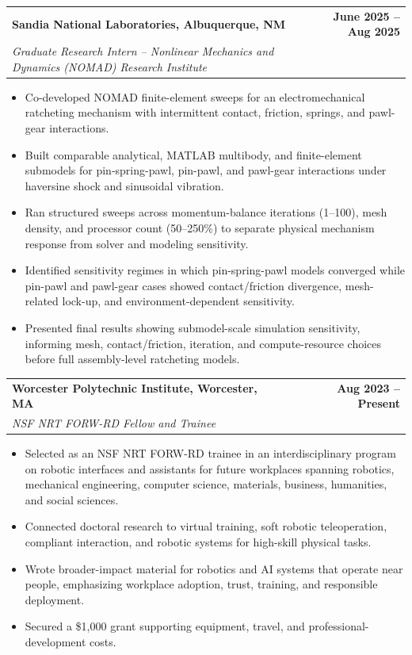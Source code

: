 \documentclass[10pt,letterpaper]{article}
\makeatletter
\newcommand{\roleentry}[4]{%
  \begin{tabularx}{\textwidth}{@{}>{\raggedright\arraybackslash}X r@{}}
    \textbf{#1} & \textbf{#2}\\
    \textit{\textcolor{muted}{#3}} & \textit{\textcolor{muted}{#4}}
  \end{tabularx}
  \vspace{-2pt}
}
\makeatother
\begin{document}
\roleentry{Sandia National Laboratories, Albuquerque, NM}{June 2025 -- Aug 2025}{Graduate Research Intern -- Nonlinear Mechanics and Dynamics (NOMAD) Research Institute}{}
\begin{itemize}
  \item Co-developed NOMAD finite-element sweeps for an electromechanical ratcheting mechanism with intermittent contact, friction, springs, and pawl-gear interactions.
  \item Built comparable analytical, MATLAB multibody, and finite-element submodels for pin-spring-pawl, pin-pawl, and pawl-gear interactions under haversine shock and sinusoidal vibration.
  \item Ran structured sweeps across momentum-balance iterations (1--100), mesh density, and processor count (50--250\%) to separate physical mechanism response from solver and modeling sensitivity.
  \item Identified sensitivity regimes in which pin-spring-pawl models converged while pin-pawl and pawl-gear cases showed contact/friction divergence, mesh-related lock-up, and environment-dependent sensitivity.
  \item Presented final results showing submodel-scale simulation sensitivity, informing mesh, contact/friction, iteration, and compute-resource choices before full assembly-level ratcheting models.
\end{itemize}

\roleentry{Worcester Polytechnic Institute, Worcester, MA}{Aug 2023 -- Present}{NSF NRT FORW-RD Fellow and Trainee}{}
\begin{itemize}
  \item Selected as an NSF NRT FORW-RD trainee in an interdisciplinary program on robotic interfaces and assistants for future workplaces spanning robotics, mechanical engineering, computer science, materials, business, humanities, and social sciences.
  \item Connected doctoral research to virtual training, soft robotic teleoperation, compliant interaction, and robotic systems for high-skill physical tasks.
  \item Wrote broader-impact material for robotics and AI systems that operate near people, emphasizing workplace adoption, trust, training, and responsible deployment.
  \item Secured a \$1,000 grant supporting equipment, travel, and professional-development costs.
\end{itemize}
\end{document}
